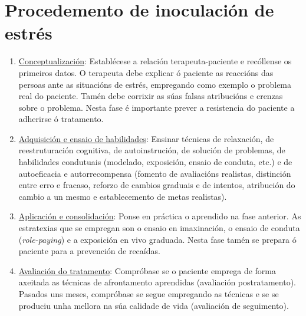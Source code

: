\documentclass[a4paper,11pt]{article}
\begin{document}
\section{Procedemento de inoculación de estrés}
\begin{enumerate}
	\item \underline{Conceptualización}: Establécese a relación terapeuta-paciente e recóllense os 
	primeiros datos. O terapeuta debe explicar ó paciente as reaccións das persoas ante as situacións 
	de estrés, empregando como exemplo o problema real do paciente. Tamén debe corrixir as súas 
	falsas atribucións e crenzas sobre o problema. Nesta fase é importante prever a resistencia do 
	paciente a adherirse ó tratamento.
	\item \underline{Adquisición e ensaio de habilidades}: Ensinar técnicas de relaxación, de 
	reestruturación cognitiva, de autoinstrución, de solución de problemas, de habilidades condutuais 
	(modelado, exposición, ensaio de conduta, etc.) e de autoeficacia e autorrecompensa (fomento de 
	avaliacións realistas, distinción entre erro e fracaso, reforzo de cambios graduais e de 
	intentos, atribución do cambio a un mesmo e establecemento de metas realistas). 
	\item \underline{Aplicación e consolidación}: Ponse en práctica o aprendido na fase anterior. As 
	estratexias que se empregan son o ensaio en imaxinación, o ensaio de conduta 
	(\textit{role-paying}) e a exposición en vivo graduada. Nesta fase tamén se prepara ó paciente 
	para a prevención de recaídas. 
	\item \underline{Avaliación do tratamento}: Compróbase se o paciente emprega de forma axeitada as 
	técnicas de afrontamento aprendidas (avaliación postratamento). Pasados uns meses, compróbase se 
	segue empregando as técnicas e se se produciu unha mellora na súa calidade de vida (avaliación de 
	seguimento). 
\end{enumerate}
\end{document}
